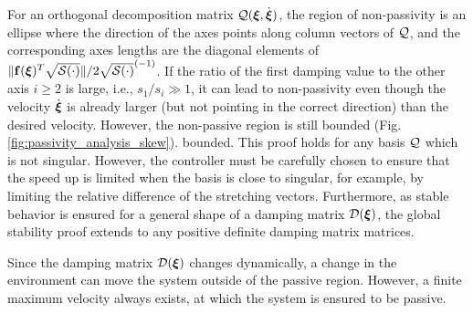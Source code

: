 \else
{}
\fi
For an orthogonal decomposition matrix $\mathcal{Q}(\boldsymbol{{\boldsymbol{\xi}}}, \dot{\boldsymbol{\xi}})$, the region of non-passivity is an ellipse where the direction of the axes points along column vectors of $\mathcal{Q}$, and the corresponding axes lengths are the diagonal elements of $\| \mathbf{f}({\boldsymbol{\xi}})^T \sqrt{\mathcal{S}(\cdot)}\| / 2 \sqrt{\mathcal{S}(\cdot)}^{(-1)}$. 
If the ratio of the first damping value to the other axis $i \geq 2$ is large, i.e., $s_1 / s_i \gg 1$, it can lead to non-passivity even though the velocity $\dot{\boldsymbol{\xi}}$ is already larger (but not pointing in the correct direction) than the desired velocity. However, the non-passive region is still \iflong bounded (Fig.\ref{fig:passivity_analysis_skew}). \else bounded. \fi
This proof holds for any basis $\mathcal{Q}$ which is not singular. However, the controller must be carefully chosen to ensure that the speed up is limited when the basis is close to singular, for example, by limiting the relative difference of the stretching vectors. Furthermore, as stable behavior is ensured for a general shape of a damping matrix $\mathcal{D}(\boldsymbol{\xi})$, the global stability proof extends to any positive definite damping matrix matrices.

Since the damping matrix $\mathcal{D}(\boldsymbol{\xi})$ changes dynamically, a change in the environment can move the system outside of the passive region. However, a finite maximum velocity always exists, at which the system is ensured to be passive.

